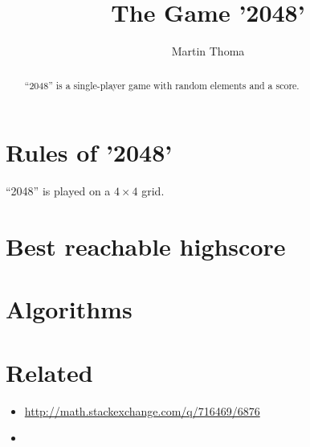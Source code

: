 \documentclass[a4paper]{scrartcl}
\title{The Game '2048'}
\author{Martin Thoma}
\begin{document}
\maketitle
\begin{abstract}
\enquote{2048} is a single-player game with random elements and a score.
\end{abstract}

\section{Rules of '2048'}
\enquote{2048} is played on a $4 \times 4$ grid.

\section{Best reachable highscore}

\section{Algorithms}

\section{Related}
\begin{itemize}
    \item \url{http://math.stackexchange.com/q/716469/6876}
    \item 
\end{itemize}
\end{document}
